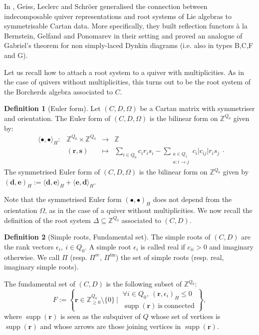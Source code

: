 \documentclass[11pt,english]{article}
\numberwithin{equation}{section}
\numberwithin{figure}{section}
\theoremstyle{definition}
\newtheorem{df}{Definition}[subsection]
\theoremstyle{plain}
\theoremstyle{remark}
\DeclareMathOperator{\supp}{supp}
\newcommand\dd{\mathbf{d}}
\newcommand\ee{\mathbf{e}}
\newcommand\rr{\mathbf{r}}
\newcommand\ZZ{\mathbb{Z}}
\begin{document}
In \cite{GLS17a}, Geiss, Leclerc and Schröer generalised the connection
between indecomposable quiver representations and root systems of
Lie algebras to symmetrisable Cartan data. More specifically, they
built reflection functors à la Bernstein, Gelfand and Ponomarev in
their setting and proved an analogue of Gabriel's theorem for non
simply-laced Dynkin diagrams (i.e. also in types B,C,F and G).

Let us recall how to attach a root system to a quiver with multiplicities.
As in the case of quivers without multiplicities, this turns out to
be the root system of the Borcherds algebra associated to $C$.

\begin{df}[Euler form]

Let $(C,D,\Omega)$ be a Cartan matrix with symmetriser and orientation.
The Euler form of $(C,D,\Omega)$ is the bilinear form on $\ZZ^{Q_{0}}$
given by:\[
\begin{array}{cccc}
\langle\bullet,\bullet\rangle_H: & \ZZ^{Q_0}\times\ZZ^{Q_0} & \rightarrow & \ZZ \\
& (\rr,\mathbf{s}) & \mapsto & \sum_{i\in Q_0}c_ir_is_i-\sum_{\substack{a\in Q_1 \\ a:i\rightarrow j}}c_i\vert c_{ij}\vert r_{i}s_{j}
\end{array}
.
\] The symmetrised Euler form of $(C,D,\Omega)$ is the bilinear form
on $\ZZ^{Q_{0}}$ given by $(\dd,\ee)_{H}:=\langle\dd,\ee\rangle_{H}+\langle\ee,\dd\rangle_{H}$.

\end{df}

Note that the symmetrised Euler form $(\bullet,\bullet)_{H}$ does
not depend from the orientation $\Omega$, as in the case of a quiver
without multiplicities. We now recall the definition of the root system
$\Delta\subseteq\ZZ^{Q_{0}}$ associated to $(C,D)$.

\begin{df}[Simple roots, Fundamental set]

The simple roots of $(C,D)$ are the rank vectors $\epsilon_{i},\ i\in Q_{0}$.
A simple root $\epsilon_{i}$ is called real if $c_{ii}>0$ and imaginary
otherwise. We call $\Pi$ (resp. $\Pi^{\mathrm{re}}$, $\Pi^{\mathrm{im}}$)
the set of simple roots (resp. real, imaginary simple roots).

The fundamental set of $(C,D)$ is the following subset of $\ZZ^{Q_{0}}$:\[
F:=
\left\{
\rr\in\ZZ_{\geq0}^{Q_0}\setminus\{0\}\ \vert\ 
\substack{
\forall i\in Q_0,\ (\rr,\epsilon_i)_H\leq0 \\
\supp(\rr)\ \mathrm{is}\ \mathrm{connected}
}
\right\},
\] where $\supp(\rr)$ is seen as the subquiver of $Q$ whose set of
vertices is $\supp(\rr)$ and whose arrows are those joining vertices
in $\supp(\rr)$.

\end{df}
\end{document}
